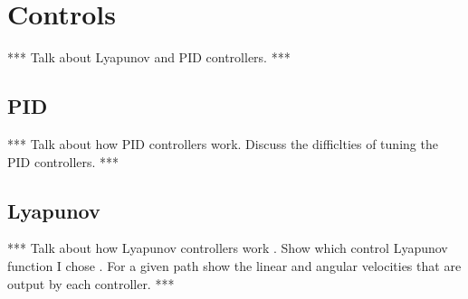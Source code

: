 \chapter{Controls}
\label{ch:controls}
*** Talk about Lyapunov and PID controllers. ***

\section{PID}
*** Talk about how PID controllers work. Discuss the difficlties of tuning the PID controllers. ***

\section{Lyapunov}
*** Talk about how Lyapunov controllers work \cite{Khalil02}. Show which control Lyapunov function I chose \cite{Rusu05RobotuxLyapunov}. For a given path show the linear and angular velocities that are output by each controller. ***